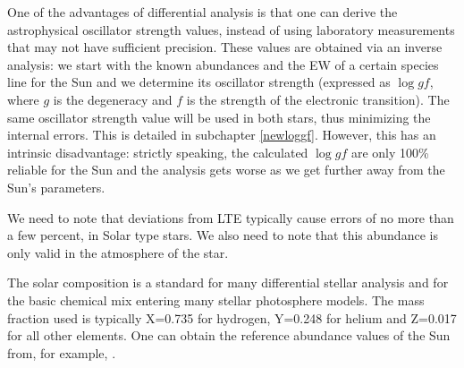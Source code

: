 \documentclass[dvips,12pt,a4paper]{report}
\begin{document}
{One of the advantages of differential analysis is that one can derive the astrophysical oscillator strength values, instead of using laboratory measurements that may not have sufficient precision. These values are obtained via an inverse analysis: we start with the known abundances and the EW of a certain species line for the Sun and we determine its oscillator strength (expressed as $\log gf$, where $g$ is the degeneracy and $f$ is the strength of the electronic transition). The same oscillator strength value will be used in both stars, thus minimizing the internal errors. This is detailed in subchapter \ref{newloggf}. However, this has an intrinsic disadvantage: strictly speaking, the calculated $\log gf$ are only 100\% reliable for the Sun and the analysis gets worse as we get further away from the Sun's parameters.

We need to note that deviations from LTE typically cause errors of no more than a few percent, in Solar type stars. We also need to note that this abundance is only valid in the atmosphere of the star. %

The solar composition is a standard for many differential stellar analysis and for the basic chemical mix entering many stellar photosphere models. The mass fraction used is typically X=0.735 for hydrogen, Y=0.248 for helium and Z=0.017 for all other elements. One can obtain the reference abundance values of the Sun from, for example, \citet{Anders-1989}.




}
\end{document}
